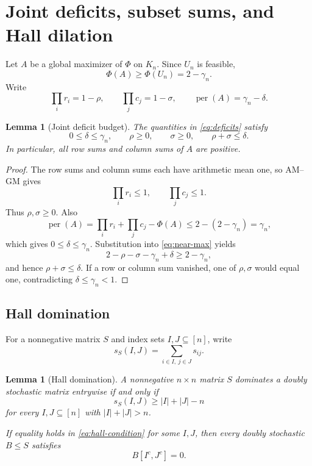 \documentclass[11pt,a4paper]{article}
\numberwithin{equation}{section}
\newtheorem{lemma}[theorem]{Lemma}
\theoremstyle{definition}
\newcommand{\per}{\operatorname{per}}
\newcommand{\1}{\mathbf{1}}
\begin{document}
\section{Joint deficits, subset sums, and Hall dilation}\label{sec:hall}

Let $A$ be a global maximizer of $\Phi$ on $K_n$.  Since $U_n$ is feasible,
\begin{equation}\label{eq:near-max}
 \Phi(A)\ge \Phi(U_n)=2-\gamma_n.
\end{equation}
Write
\begin{equation}\label{eq:deficits}
 \prod_i r_i=1-\rho,
 \qquad
 \prod_jc_j=1-\sigma,
 \qquad
 \per(A)=\gamma_n-\delta.
\end{equation}

\begin{lemma}[Joint deficit budget]\label{lem:joint-deficit}
The quantities in \eqref{eq:deficits} satisfy
\begin{equation}\label{eq:joint-budget}
 0\le\delta\le\gamma_n,
 \qquad
 \rho\ge0,
 \qquad
 \sigma\ge0,
 \qquad
 \rho+\sigma\le\delta.
\end{equation}
In particular, all row sums and column sums of $A$ are positive.
\end{lemma}

\begin{proof}
The row sums and column sums each have arithmetic mean one, so AM--GM gives
\[
 \prod_i r_i\le1,
 \qquad
 \prod_jc_j\le1.
\]
Thus $\rho,\sigma\ge0$.  Also
\[
 \per(A)
 =\prod_i r_i+\prod_jc_j-\Phi(A)
 \le2-(2-\gamma_n)=\gamma_n,
\]
which gives $0\le\delta\le\gamma_n$.  Substitution into \eqref{eq:near-max} yields
\[
 2-\rho-\sigma-\gamma_n+\delta\ge2-\gamma_n,
\]
and hence $\rho+\sigma\le\delta$.  If a row or column sum vanished, one of $\rho,\sigma$ would equal one, contradicting $\delta\le\gamma_n<1$.
\end{proof}

\subsection{Hall domination}

For a nonnegative matrix $S$ and index sets $I,J\subseteq[n]$, write
\[
 s_S(I,J)=\sum_{i\in I,\ j\in J}s_{ij}.
\]

\begin{lemma}[Hall domination]\label{lem:hall}
A nonnegative $n\times n$ matrix $S$ dominates a doubly stochastic matrix entrywise if and only if
\begin{equation}\label{eq:hall-condition}
 s_S(I,J)\ge |I|+|J|-n
\end{equation}
for every $I,J\subseteq[n]$ with $|I|+|J|>n$.

If equality holds in \eqref{eq:hall-condition} for some $I,J$, then every doubly stochastic $B\le S$ satisfies
\begin{equation}\label{eq:forced-block}
 B[I^c,J^c]=0.
\end{equation}
\end{lemma}
\end{document}

